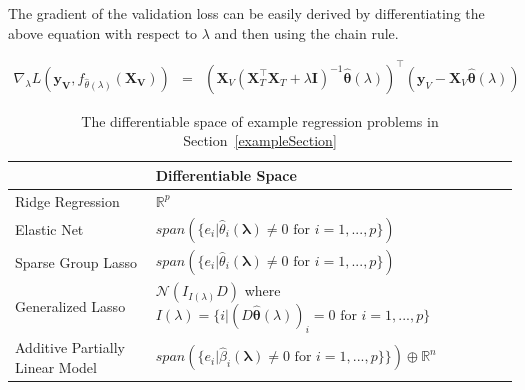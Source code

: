 \documentclass[10pt,letterpaper]{article}
\begin{document}
The gradient of the validation loss can be easily derived by differentiating the above equation with respect to $\lambda$ and then using the chain rule.

\begin{equation}
\begin{array} {lcl}
\nabla_{\lambda} L(\boldsymbol{y_V}, f_{\hat \theta(\lambda)}(\boldsymbol{X_V}))
&=& (\boldsymbol{X}_V(\boldsymbol{X}_T^\top \boldsymbol{X}_T + \lambda \boldsymbol{I})^{-1}
\hat{\boldsymbol{\theta}}(\lambda))^{\top}
(\boldsymbol{y}_V - \boldsymbol{X}_V \hat{\boldsymbol{\theta}}(\lambda))
\end{array}
\end{equation}

\begin{table} 
\begin{center}

\begin{tabular}{| l | l | l | }
\hline
 &  Differentiable Space \\
\hline
Ridge Regression & $\mathbb{R}^p$\\
\hline
Elastic Net & $span(\{e_i | \hat{\theta}_i\left(\boldsymbol{\lambda}\right) \ne 0 \text{ for } i=1,...,p \})$\\
\hline
Sparse Group Lasso & $span(\{e_i | \hat{\theta}_i\left(\boldsymbol{\lambda}\right) \ne 0  \text{ for } i=1,...,p \})$ \\
\hline
Generalized Lasso & $\mathcal{N}(I_{I(\lambda)} D)$ where $I(\lambda) = \{ i | \left(D \hat{\boldsymbol{\theta}}(\lambda)\right)_i = 0  \text{ for } i=1,...,p \}$ \\
\hline
Additive Partially Linear Model & $span(\{e_i | \hat{\beta}_i\left(\boldsymbol{\lambda}\right) \ne 0  \text{ for } i=1,...,p \} \})  \oplus  \mathbb{R}^{n}$\\
\hline
\end{tabular}
\end{center}
\caption {The differentiable space of example regression problems in Section~\ref{exampleSection}}
\label{table:differentiableSpace}
\end{table}
\end{document}
